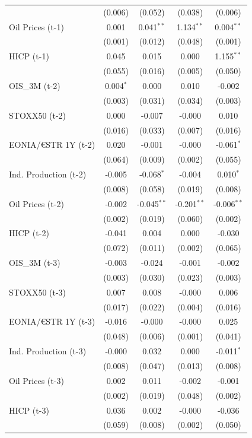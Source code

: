 \begin{longtable}[t]{lcccc}
 & (0.006) & (0.052) & (0.038) & (0.006)\\
Oil Prices (t-1) & 0.001 & 0.041$^{**}$ & 1.134$^{**}$ & 0.004$^{**}$\\
 & (0.001) & (0.012) & (0.048) & (0.001)\\
HICP (t-1) & 0.045 & 0.015 & 0.000 & 1.155$^{**}$\\
 & (0.055) & (0.016) & (0.005) & (0.050)\\
OIS\_3M (t-2) & 0.004$^{*}$ & 0.000 & 0.010 & -0.002\\
 & (0.003) & (0.031) & (0.034) & (0.003)\\
STOXX50 (t-2) & 0.000 & -0.007 & -0.000 & 0.010\\
 & (0.016) & (0.033) & (0.007) & (0.016)\\
EONIA/€STR 1Y (t-2) & 0.020 & -0.001 & -0.000 & -0.061$^{*}$\\
 & (0.064) & (0.009) & (0.002) & (0.055)\\
Ind. Production (t-2) & -0.005 & -0.068$^{*}$ & -0.004 & 0.010$^{*}$\\
 & (0.008) & (0.058) & (0.019) & (0.008)\\
Oil Prices (t-2) & -0.002 & -0.045$^{**}$ & -0.201$^{**}$ & -0.006$^{**}$\\
 & (0.002) & (0.019) & (0.060) & (0.002)\\
HICP (t-2) & -0.041 & 0.004 & 0.000 & -0.030\\
 & (0.072) & (0.011) & (0.002) & (0.065)\\
OIS\_3M (t-3) & -0.003 & -0.024 & -0.001 & -0.002\\
 & (0.003) & (0.030) & (0.023) & (0.003)\\
STOXX50 (t-3) & 0.007 & 0.008 & -0.000 & 0.006\\
 & (0.017) & (0.022) & (0.004) & (0.016)\\
EONIA/€STR 1Y (t-3) & -0.016 & -0.000 & -0.000 & 0.025\\
 & (0.048) & (0.006) & (0.001) & \vphantom{1} (0.041)\\
Ind. Production (t-3) & -0.000 & 0.032 & 0.000 & -0.011$^{*}$\\
 & (0.008) & (0.047) & (0.013) & (0.008)\\
Oil Prices (t-3) & 0.002 & 0.011 & -0.002 & -0.001\\
 & (0.002) & (0.019) & (0.048) & (0.002)\\
HICP (t-3) & 0.036 & 0.002 & -0.000 & -0.036\\
 & (0.059) & (0.008) & (0.002) & (0.050)\\

\end{longtable}
